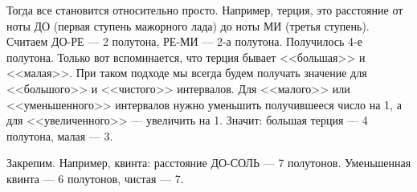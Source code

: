 Тогда все становится относительно просто. Например, терция, это расстояние от ноты ДО (первая ступень мажорного лада) до ноты МИ (третья ступень). Считаем ДО-РЕ --- 2 полутона, РЕ-МИ --- 2-а полутона. Получилось 4-е полутона. Только вот вспоминается, что терция бывает <<большая>> и <<малая>>. При таком подходе мы всегда будем получать значение для <<большого>> и <<чистого>> интервалов. Для <<малого>> или <<уменьшенного>> интервалов нужно уменьшить получившееся число на 1, а для <<увеличенного>> --- увеличить на 1. Значит: большая терция --- 4 полутона, малая --- 3.

Закрепим. Например, квинта: расстояние ДО-СОЛЬ --- 7 полутонов. Уменьшенная квинта --- 6 полутонов, чистая --- 7.
